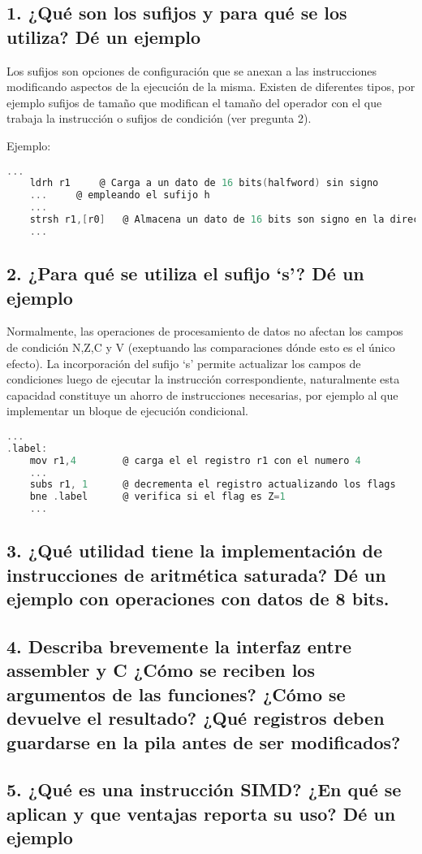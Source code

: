 \documentclass[10pt,a4paper,twoside,spanish]{article}	%
\begin{document}
\subsection*{1. ¿Qué son los sufijos y para qué se los utiliza? Dé un ejemplo}

Los sufijos son opciones de configuración que se anexan a las instrucciones modificando aspectos de la ejecución de la misma. Existen de diferentes tipos, por ejemplo sufijos de tamaño que modifican el tamaño del operador con el que trabaja la instrucción o sufijos de condición (ver pregunta 2).

Ejemplo:
\begin{lstlisting}[language=C]
	...
	ldrh r1		@ Carga a un dato de 16 bits(halfword) sin signo 
	...		@ empleando el sufijo h 
	...
	strsh r1,[r0]	@ Almacena un dato de 16 bits son signo en la direccion r0	
	...
\end{lstlisting}




\subsection*{2. ¿Para qué se utiliza el sufijo ‘s’? Dé un ejemplo}

Normalmente, las operaciones de procesamiento de datos no afectan los campos de condición N,Z,C y V  (exeptuando las comparaciones dónde esto es el único efecto). La incorporación del sufijo ‘s’ permite actualizar los campos de condiciones luego de ejecutar la instrucción correspondiente, naturalmente esta capacidad constituye un ahorro de instrucciones necesarias, por ejemplo al que implementar un bloque de ejecución condicional.

\begin{lstlisting}[language=C]
	...
.label:
	mov r1,4		@ carga el el registro r1 con el numero 4 
	...	
	subs r1, 1		@ decrementa el registro actualizando los flags			
	bne .label		@ verifica si el flag es Z=1
	...
\end{lstlisting}


\subsection*{3. ¿Qué utilidad tiene la implementación de instrucciones de aritmética saturada? Dé un ejemplo con operaciones con datos de 8 bits.}

\subsection*{4. Describa brevemente la interfaz entre assembler y C ¿Cómo se reciben los argumentos de las funciones? ¿Cómo se devuelve el resultado? ¿Qué registros deben guardarse en la pila antes de ser modificados?}

\subsection*{5. ¿Qué es una instrucción SIMD? ¿En qué se aplican y que ventajas reporta su uso? Dé un ejemplo}
\end{document}
